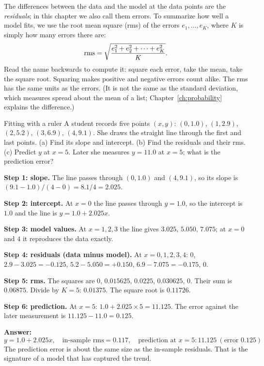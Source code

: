 The differences between the data and the model at the data points are the \emph{residuals}; in this chapter we also call them errors. To summarize how well a model fits, we use the root mean square (rms) of the errors $e_1, \ldots, e_K$, where $K$ is simply how many errors there are:
\begin{equation}
\mathrm{rms} = \sqrt{\frac{e_1^2 + e_2^2 + \cdots + e_K^2}{K}} .
\label{eq:intro-rms}
\end{equation}
Read the name backwards to compute it: square each error, take the mean, take the square root. Squaring makes positive and negative errors count alike. The rms has the same units as the errors. (It is not the same as the standard deviation, which measures spread about the mean of a list; Chapter~\ref{ch:probability} explains the difference.)

\begin{sample}{Fitting with a ruler}
A student records five points $(x, y)$: $(0, 1.0)$, $(1, 2.9)$, $(2, 5.2)$, $(3, 6.9)$, $(4, 9.1)$. She draws the straight line through the first and last points. (a) Find its slope and intercept. (b) Find the residuals and their rms. (c) Predict $y$ at $x = 5$. Later she measures $y = 11.0$ at $x = 5$; what is the prediction error?

\textbf{Step 1: slope.} The line passes through $(0, 1.0)$ and $(4, 9.1)$, so its slope is $(9.1 - 1.0)/(4 - 0) = 8.1/4 = 2.025$.

\textbf{Step 2: intercept.} At $x=0$ the line passes through $y = 1.0$, so the intercept is $1.0$ and the line is $y = 1.0 + 2.025x$.

\textbf{Step 3: model values.} At $x = 1, 2, 3$ the line gives $3.025$, $5.050$, $7.075$; at $x=0$ and $4$ it reproduces the data exactly.

\textbf{Step 4: residuals (data minus model).} At $x=0,1,2,3,4$: $0$, $2.9-3.025 = -0.125$, $5.2 - 5.050 = +0.150$, $6.9 - 7.075 = -0.175$, $0$.

\textbf{Step 5: rms.} The squares are $0$, $0.015625$, $0.0225$, $0.030625$, $0$. Their sum is $0.06875$. Divide by $K = 5$: $0.01375$. The square root is $0.11726$.

\textbf{Step 6: prediction.} At $x = 5$: $1.0 + 2.025 \times 5 = 11.125$. The error against the later measurement is $11.125 - 11.0 = 0.125$.

\textbf{Answer:}
\[
\boxed{y = 1.0 + 2.025x,\quad \text{in-sample rms} = 0.117,\quad \text{prediction at } x=5: 11.125\ (\text{error } 0.125)}
\]
The prediction error is about the same size as the in-sample residuals. That is the signature of a model that has captured the trend.
\end{sample}

